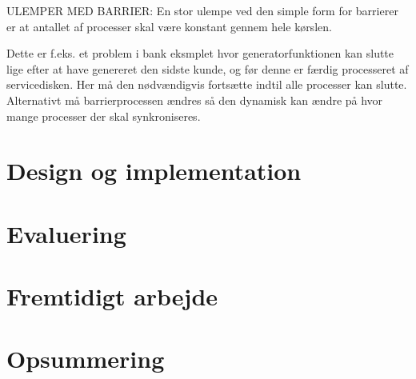 ULEMPER MED BARRIER:
En stor ulempe ved den simple form for barrierer er at antallet af processer skal være konstant gennem hele kørslen.

Dette er f.eks. et problem i bank eksmplet hvor generatorfunktionen kan slutte lige efter at have genereret den sidste kunde, og før denne er færdig processeret af servicedisken. Her må den nødvændigvis fortsætte indtil alle processer kan slutte. Alternativt må barrierprocessen ændres så den dynamisk kan ændre på hvor mange processer der skal synkroniseres.


  \section{Design og implementation}
    
  \section{Evaluering}
  \section{Fremtidigt arbejde}
  \section{Opsummering}
